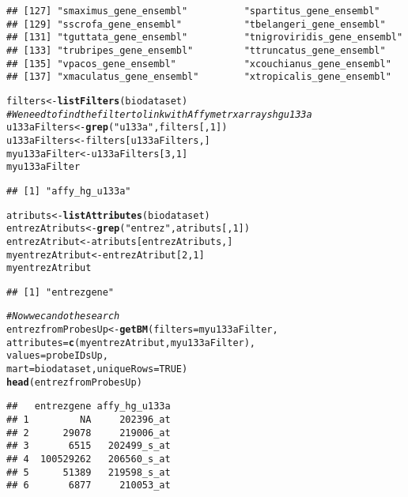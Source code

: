 \documentclass{article}\usepackage[]{graphicx}\usepackage[]{color}
\makeatletter
\newcommand{\hlnum}[1]{\textcolor[rgb]{0.686,0.059,0.569}{#1}}%
\newcommand{\hlstr}[1]{\textcolor[rgb]{0.192,0.494,0.8}{#1}}%
\newcommand{\hlcom}[1]{\textcolor[rgb]{0.678,0.584,0.686}{\textit{#1}}}%
\newcommand{\hlstd}[1]{\textcolor[rgb]{0.345,0.345,0.345}{#1}}%
\newcommand{\hlkwb}[1]{\textcolor[rgb]{0.69,0.353,0.396}{#1}}%
\newcommand{\hlkwc}[1]{\textcolor[rgb]{0.333,0.667,0.333}{#1}}%
\newcommand{\hlkwd}[1]{\textcolor[rgb]{0.737,0.353,0.396}{\textbf{#1}}}%
\newenvironment{kframe}{%
 \def\at@end@of@kframe{}%
 \ifinner\ifhmode%
  \def\at@end@of@kframe{\end{minipage}}%
  \begin{minipage}{\columnwidth}%
 \fi\fi%
 \def\FrameCommand##1{\hskip\@totalleftmargin \hskip-\fboxsep
 \colorbox{shadecolor}{##1}\hskip-\fboxsep
     \hskip-\linewidth \hskip-\@totalleftmargin \hskip\columnwidth}%
 \MakeFramed {\advance\hsize-\width
   \@totalleftmargin\z@ \linewidth\hsize
   \@setminipage}}%
 {\par\unskip\endMakeFramed%
 \at@end@of@kframe}
\newenvironment{knitrout}{}{} %
\makeatother
\begin{document}
\begin{knitrout}
\begin{kframe}
\begin{verbatim}
## [127] "smaximus_gene_ensembl"          "spartitus_gene_ensembl"        
## [129] "sscrofa_gene_ensembl"           "tbelangeri_gene_ensembl"       
## [131] "tguttata_gene_ensembl"          "tnigroviridis_gene_ensembl"    
## [133] "trubripes_gene_ensembl"         "ttruncatus_gene_ensembl"       
## [135] "vpacos_gene_ensembl"            "xcouchianus_gene_ensembl"      
## [137] "xmaculatus_gene_ensembl"        "xtropicalis_gene_ensembl"
\end{verbatim}
\begin{alltt}
\hlstd{filters}\hlkwb{<-}\hlkwd{listFilters}\hlstd{(biodataset)}
\hlcom{# We need to find the filter to link with Affymetrx arrays hgu133a}
\hlstd{u133aFilters}\hlkwb{<-} \hlkwd{grep}\hlstd{(}\hlstr{"u133a"}\hlstd{, filters[,}\hlnum{1}\hlstd{] )}
\hlstd{u133aFilters} \hlkwb{<-} \hlstd{filters[u133aFilters,]}
\hlstd{myu133aFilter} \hlkwb{<-} \hlstd{u133aFilters[}\hlnum{3}\hlstd{,}\hlnum{1}\hlstd{]}
\hlstd{myu133aFilter}
\end{alltt}
\begin{verbatim}
## [1] "affy_hg_u133a"
\end{verbatim}
\begin{alltt}
\hlstd{atributs}\hlkwb{<-} \hlkwd{listAttributes}\hlstd{(biodataset)}
\hlstd{entrezAtributs}\hlkwb{<-} \hlkwd{grep}\hlstd{(}\hlstr{"entrez"}\hlstd{, atributs[,}\hlnum{1}\hlstd{])}
\hlstd{entrezAtribut} \hlkwb{<-} \hlstd{atributs[entrezAtributs,]}
\hlstd{myentrezAtribut} \hlkwb{<-} \hlstd{entrezAtribut[}\hlnum{2}\hlstd{,}\hlnum{1}\hlstd{]}
\hlstd{myentrezAtribut}
\end{alltt}
\begin{verbatim}
## [1] "entrezgene"
\end{verbatim}
\begin{alltt}
\hlcom{# Now we can do the search}
\hlstd{entrezfromProbesUp} \hlkwb{<-} \hlkwd{getBM}\hlstd{(}\hlkwc{filters}\hlstd{= myu133aFilter,}
                          \hlkwc{attributes}\hlstd{=} \hlkwd{c}\hlstd{(myentrezAtribut, myu133aFilter),}
                          \hlkwc{values}\hlstd{= probeIDsUp,}
                          \hlkwc{mart}\hlstd{= biodataset,}\hlkwc{uniqueRows}\hlstd{=}\hlnum{TRUE}\hlstd{)}
\hlkwd{head}\hlstd{(entrezfromProbesUp)}
\end{alltt}
\begin{verbatim}
##   entrezgene affy_hg_u133a
## 1         NA     202396_at
## 2      29078     219006_at
## 3       6515   202499_s_at
## 4  100529262   206560_s_at
## 5      51389   219598_s_at
## 6       6877     210053_at
\end{verbatim}
\end{kframe}
\end{knitrout}
\end{document}
